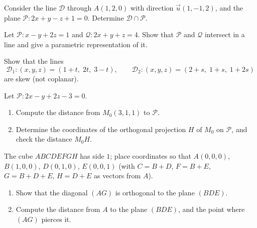 \begin{exercise}[$\star\star$]\label{exo:tle:space:4}
Consider the line $\mathcal D$ through $A(1, 2, 0)$ with direction
$\vec u(1, -1, 2)$, and the plane $\mathcal P : 2x + y - z + 1 = 0$.
Determine $\mathcal D \cap \mathcal P$.
\end{exercise}

\begin{exercise}[$\star\star$]\label{exo:tle:space:5}
Let $\mathcal P : x - y + 2z = 1$ and $\mathcal Q : 2x + y + z = 4$.
Show that $\mathcal P$ and $\mathcal Q$ intersect in a line and give a
parametric representation of it.
\end{exercise}

\begin{exercise}[$\star\star$]\label{exo:tle:space:6}
Show that the lines
\[
\mathcal D_1 : (x, y, z) = (1 + t,\; 2t,\; 3 - t), \qquad
\mathcal D_2 : (x, y, z) = (2 + s,\; 1 + s,\; 1 + 2s)
\]
are skew (not coplanar).
\end{exercise}

\begin{exercise}[$\star\star$]\label{exo:tle:space:7}
Let $\mathcal P : 2x - y + 2z - 3 = 0$.
\begin{enumerate}
  \item Compute the distance from $M_0(3, 1, 1)$ to $\mathcal P$.
  \item Determine the coordinates of the orthogonal projection $H$ of
        $M_0$ on $\mathcal P$, and check the distance $M_0H$.
\end{enumerate}
\end{exercise}

\begin{exercise}[$\star\star\star$]\label{exo:tle:space:8}
The cube $ABCDEFGH$ has side $1$; place coordinates so that
$A(0,0,0)$, $B(1,0,0)$, $D(0,1,0)$, $E(0,0,1)$ (with
$C = B + D$, $F = B + E$, $G = B + D + E$, $H = D + E$ as vectors from
$A$).
\begin{enumerate}
  \item Show that the diagonal $(AG)$ is orthogonal to the plane $(BDE)$.
  \item Compute the distance from $A$ to the plane $(BDE)$, and the point
        where $(AG)$ pierces it.
\end{enumerate}
\end{exercise}

